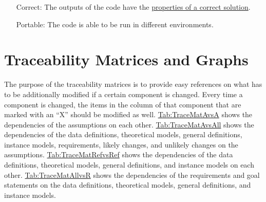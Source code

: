 \documentclass[12pt]{article}
\begin{document}
\begin{itemize}
\item[Correct:\phantomsection\label{correct}]{The outputs of the code have the \hyperref[Sec:CorSolProps]{properties of a correct solution}.}
\item[Portable:\phantomsection\label{portable}]{The code is able to be run in different environments.}
\end{itemize}
\section{Traceability Matrices and Graphs}
\label{Sec:TraceMatrices}
The purpose of the traceability matrices is to provide easy references on what has to be additionally modified if a certain component is changed. Every time a component is changed, the items in the column of that component that are marked with an ``X'' should be modified as well. \hyperref[Table:TraceMatAvsA]{Tab:TraceMatAvsA} shows the dependencies of the assumptions on each other. \hyperref[Table:TraceMatAvsAll]{Tab:TraceMatAvsAll} shows the dependencies of the data definitions, theoretical models, general definitions, instance models, requirements, likely changes, and unlikely changes on the assumptions. \hyperref[Table:TraceMatRefvsRef]{Tab:TraceMatRefvsRef} shows the dependencies of the data definitions, theoretical models, general definitions, and instance models on each other. \hyperref[Table:TraceMatAllvsR]{Tab:TraceMatAllvsR} shows the dependencies of the requirements and goal statements on the data definitions, theoretical models, general definitions, and instance models.
\end{document}
